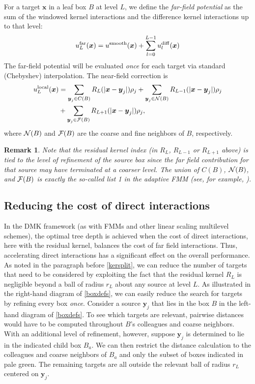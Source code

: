 \documentclass[final,letterpaper]{siamart171218}
\newtheorem{remark}[theorem]{Remark}
\newcommand{\be}{\begin{equation}}
\newcommand{\ee}{\end{equation}}
\newcommand{\ba}{\begin{aligned}}
\newcommand{\ea}{\end{aligned}}
\newcommand{\x}{\boldsymbol{x}}
\newcommand{\y}{\boldsymbol{y}}
\newcommand{\acron}{DMK }
\newcommand{\cR}{r}
\begin{document}
For a target $\x$ in a leaf box $B$ at level $L$, we define the
{\em far-field potential} as the sum of the windowed kernel interactions and 
the difference kernel interactions up to that level: 
\be\label{farpotential}
u_{L}^{\rm far}(\x)=u^{\rm smooth}(\x)+\sum_{l=0}^{L-1}u_{l}^{\rm diff}(\x)
\ee
The far-field potential will be evaluated {\em once} for each
target via standard (Chebyshev) interpolation. 
The near-field correction is
\be\label{nearpotential}
\ba
u_{L}^{\rm local}(\x)&=
 \sum_{\y_j \in C(B)} R_L(|\x-\y_j|)\rho_j +
 \sum_{\y_j \in {\cal N}(B)} R_{L-1}(|\x-\y_j|)\rho_j\\
 &+
 \sum_{\y_j \in {\cal F}(B)} R_{L+1}(|\x-\y_j|)\rho_j,
\ea
\ee
where ${\cal N}(B)$ and ${\cal F}(B)$ are the coarse and fine neighbors of $B$,
respectively.

\begin{remark}
Note that the residual kernel index (in $R_L$, $R_{L-1}$ or $R_{L+1}$ above) is
tied to the level of refinement of the {\em source} box since the far field
contribution for that source may have terminated at a coarser level.
The union of $C(B)$, ${\cal N}(B)$, and ${\cal F}(B)$ is exactly the so-called
list 1 in the adaptive FMM (see, for example, \cite{cheng1999jcp}).
\end{remark}

\subsection{Reducing the cost of direct interactions} \label{localaccel}

In the \acron framework (as with FMMs and other linear scaling multilevel schemes),
the optimal tree depth is achieved when the cost of direct interactions, here with the 
residual kernel, balances the cost of far field interactions. Thus, accelerating
direct interactions has a significant effect on the overall performance.
As noted in the paragraph before \cref{kersplit}, we can reduce the number of 
targets that need to be considered by exploiting the fact that
the residual kernel $R_L$ is negligible beyond a ball of radius $\cR_L$ about any 
source at level $L$. As illustrated in the right-hand diagram
of \cref{boxdefs}, we can easily reduce the search for targets by refining 
every box {\em once}. 
Consider a source $\y_j$ that lies in the box $B$ in the 
left-hand diagram of \cref{boxdefs}. To see which targets are relevant, pairwise
distances would have to be computed throughout $B$'s colleagues and coarse neighbors.
With an additional level of refinement, however, suppose $\y_j$ is determined
to lie in the indicated child box $B_a$. We can then restrict the distance calculation 
to the colleagues and coarse neighbors of $B_a$ and only the subset of boxes
indicated in pale green. The remaining targets are all outside the relevant ball
of radius $\cR_L$ centered on $\y_j$.
\end{document}
